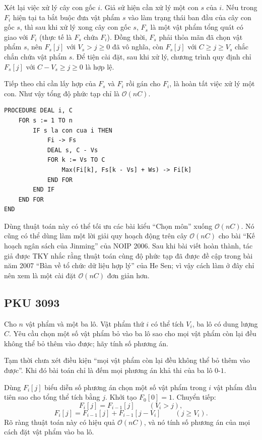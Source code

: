 \documentclass[11pt]{article}
\newcommand{\Oh}{\mathcal{O}}
\begin{document}
Xét lại việc xử lý cây con gốc \(i\). Giả sử hiện cần xử lý một con \(s\) của
\(i\). Nếu trong \(F_i\) hiện tại ta bắt buộc đưa vật phẩm \(s\) vào làm trạng
thái ban đầu của cây con gốc \(s\), thì sau khi xử lý xong cây con gốc \(s\),
\(F_s\) là một vật phẩm tổng quát có giao với \(F_i\) (thực tế là \(F_s\) chứa
\(F_i\)). Đồng thời, \(F_s\) phải thỏa mãn đã chọn vật phẩm \(s\), nên
\(F_s[j]\) với \(V_s>j\ge 0\) đã vô nghĩa, còn \(F_s[j]\) với \(C\ge j\ge V_s\)
chắc chắn chứa vật phẩm \(s\). Để tiện cài đặt, sau khi xử lý, chương trình
quy định chỉ \(F_s[j]\) với \(C-V_s\ge j\ge 0\) là hợp lệ.

Tiếp theo chỉ cần lấy hợp của \(F_s\) và \(F_i\) rồi gán cho \(F_i\), là hoàn
tất việc xử lý một con. Như vậy tổng độ phức tạp chỉ là \(\Oh(nC)\).

\begin{verbatim}
PROCEDURE DEAL i, C
    FOR s := 1 TO n
        IF s la con cua i THEN
            Fi -> Fs
            DEAL s, C - Vs
            FOR k := Vs TO C
                Max(Fi[k], Fs[k - Vs] + Ws) -> Fi[k]
            END FOR
        END IF
    END FOR
END
\end{verbatim}

Dùng thuật toán này có thể tối ưu các bài kiểu ``Chọn môn'' xuống \(\Oh(nC)\).
Nó cũng có thể dùng làm một lời giải quy hoạch động trên cây \(\Oh(nC)\) cho
bài ``Kế hoạch ngân sách của Jinming'' của NOIP 2006. Sau khi bài viết hoàn
thành, tác giả được TKY nhắc rằng thuật toán cùng độ phức tạp đã được đề cập
trong bài năm 2007 ``Bàn về tổ chức dữ liệu hợp lý'' của He Sen; vì vậy cách
làm ở đây chỉ nên xem là một cài đặt \(\Oh(nC)\) đơn giản hơn.

\subsection{PKU 3093}

Cho \(n\) vật phẩm và một ba lô. Vật phẩm thứ \(i\) có thể tích \(V_i\), ba lô
có dung lượng \(C\). Yêu cầu chọn một số vật phẩm bỏ vào ba lô sao cho mọi vật
phẩm còn lại đều không thể bỏ thêm vào được; hãy tính số phương án.

Tạm thời chưa xét điều kiện ``mọi vật phẩm còn lại đều không thể bỏ thêm vào
được''. Khi đó bài toán chỉ là đếm mọi phương án khả thi của ba lô \(0\)-\(1\).

Dùng \(F_i[j]\) biểu diễn số phương án chọn một số vật phẩm trong \(i\) vật
phẩm đầu tiên sao cho tổng thể tích bằng \(j\). Khởi tạo \(F_0[0]=1\). Chuyển
tiếp:
\[
  F_i[j]=F_{i-1}[j]\qquad (V_i>j),
\]
\[
  F_i[j]=F_{i-1}[j]+F_{i-1}[j-V_i]\qquad (j\ge V_i).
\]
Rõ ràng thuật toán này có hiệu quả \(\Oh(nC)\), và nó tính số phương án của
mọi cách đặt vật phẩm vào ba lô.
\end{document}
